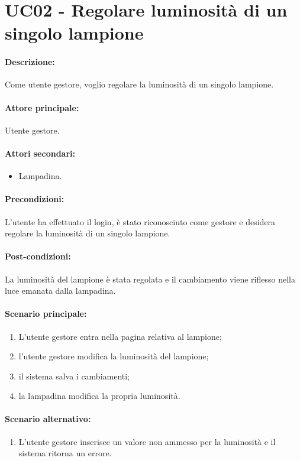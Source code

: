 \section{UC02 - Regolare luminosità di un singolo lampione}

\paragraph{Descrizione:}
Come utente gestore, voglio regolare la luminosità di un singolo lampione.

\paragraph{Attore principale:}
Utente gestore.

\paragraph{Attori secondari:}
\begin{itemize}
    \item Lampadina.
\end{itemize}

\paragraph{Precondizioni:}
L'utente ha effettuato il login, è stato riconosciuto come gestore e desidera regolare la luminosità di un singolo lampione.

\paragraph{Post-condizioni:}
La luminosità del lampione è stata regolata e il cambiamento viene riflesso nella luce emanata dalla lampadina.

\paragraph{Scenario principale:}
\begin{enumerate}
    \item L'utente gestore entra nella pagina relativa al lampione;
    \item l'utente gestore modifica la luminosità del lampione;
    \item il sistema salva i cambiamenti;
    \item la lampadina modifica la propria luminosità.
\end{enumerate}

\paragraph{Scenario alternativo:}
\begin{enumerate}
    \item L'utente gestore inserisce un valore non ammesso per la luminosità e il sistema ritorna un errore.
\end{enumerate}
